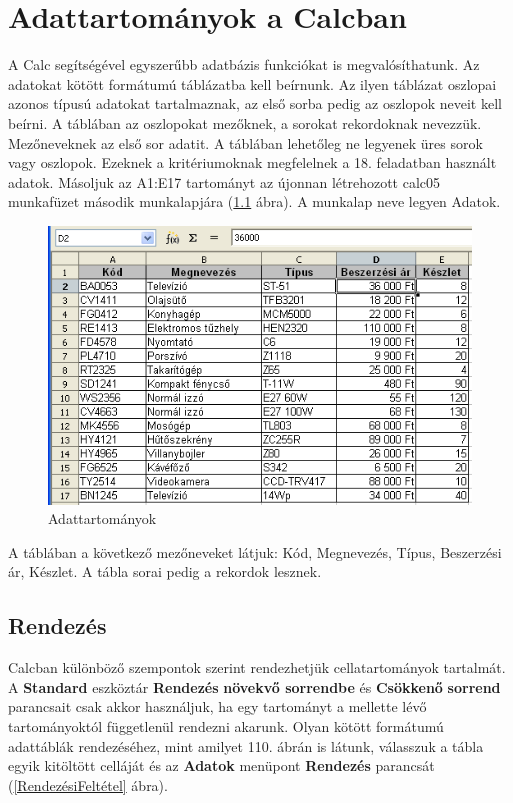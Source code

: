 \chapter{Adattartományok a Calcban}
\thispagestyle{empty}

A Calc segítségével egyszerűbb adatbázis funkciókat is
megvalósíthatunk. Az adatokat kötött formátumú
táblázatba kell beírnunk. Az ilyen táblázat oszlopai azonos
típusú adatokat tartalmaznak, az első sorba pedig az oszlopok
neveit kell beírni. A táblában az oszlopokat mezőknek, a
sorokat rekordoknak nevezzük. Mezőneveknek az első sor
adatit. A táblában lehetőleg ne legyenek üres sorok vagy
oszlopok. Ezeknek a kritériumoknak megfelelnek a 18. feladatban
használt adatok. Másoljuk az A1:E17 tartományt az újonnan
létrehozott calc05 munkafüzet második munkalapjára (\ref{Adattartományok}
ábra). A munkalap neve legyen Adatok.

\begin{figure}[!h]
\begin{center}
\includegraphics[width=13.679cm]{oocalcv1-img111.png}
\caption{Adattartományok}\label{Adattartományok}
\end{center}
\end{figure}

A táblában a következő mezőneveket látjuk: Kód,
Megnevezés, Típus, Beszerzési ár, Készlet. A tábla sorai
pedig a rekordok lesznek.


\section{Rendezés}

Calcban különböző szempontok szerint rendezhetjük
cellatartományok tartalmát. A \textbf{Standard} eszköztár
\textbf{Rendezés} \textbf{növekvő sorrendbe} és
\textbf{Csökkenő} \textbf{sorrend} parancsait csak akkor
használjuk, ha egy tartományt a mellette lévő
tartományoktól függetlenül rendezni akarunk. Olyan kötött
formátumú adattáblák rendezéséhez, mint amilyet 110.
ábrán is látunk, válasszuk a tábla egyik kitöltött
celláját és az \textbf{Adatok} menüpont \textbf{Rendezés}
parancsát (\ref{RendezésiFeltétel} ábra).

